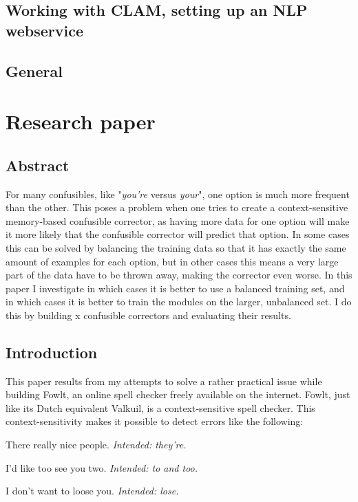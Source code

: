 \documentclass[12pt]{article}
\let\stdsection\section
\renewcommand\section{\newpage\stdsection}
\begin{document}
\subsection{Working with CLAM, setting up an NLP webservice}

\subsection{General}


\section{Research paper}

\subsection*{Abstract}

For many confusibles, like "\emph{you're} versus \emph{your}", one option is much more frequent than the other. This poses a problem when one tries to create a context-sensitive memory-based confusible corrector, as having more data for one option will make it more likely that the confusible corrector will predict that option. In some cases this can be solved by balancing the training data so that it has exactly the same amount of examples for each option, but in other cases this means a very large part of the data have to be thrown away, making the corrector even worse. In this paper I investigate in which cases it is better to use a balanced training set, and in which cases it is better to train the modules on the larger, unbalanced set. I do this by building x confusible correctors and evaluating their results.


\subsection{Introduction}

This paper results from my attempts to solve a rather practical issue while building Fowlt, an online spell checker freely available on the internet. Fowlt, just like its Dutch equivalent Valkuil, is a context-sensitive spell checker. This context-sensitivity makes it possible to detect errors like the following:

\begin{examples}

\item There really nice people. \emph{Intended: they're.}
\item I'd like too see you two. \emph{Intended: to and too.}
\item I don't want to loose you. \emph{Intended: lose.}

\end{examples}
\end{document}
